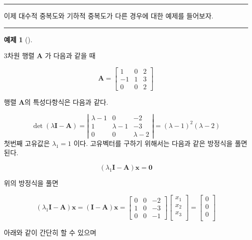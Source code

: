 \documentclass[
  11pt,
  a4paper,
  oneside]{scrbook}
\theoremstyle{definition}
\theoremstyle{definition}
\newtheorem{exercise}{예제}[chapter]
\theoremstyle{plain}
\theoremstyle{remark}
\begin{document}
\begin{center}\rule{0.5\linewidth}{0.5pt}\end{center}

이제 대수적 중복도와 기하적 중복도가 다른 경우에 대한 예제를 들어보자.

\begin{center}\rule{0.5\linewidth}{0.5pt}\end{center}

\begin{exercise}[]\protect\hypertarget{exr-Example-20-2}{}\label{exr-Example-20-2}

3차원 행렬 \(\pmb A\) 가 다음과 같을 때

\[\pmb A=\left[\begin{array}{ccc}1 & 0 & 2 \\ -1 & 1 & 3 \\ 0 & 0 & 2\end{array}\right]\]

행렬 \(\pmb A\)의 특성다항식은 다음과 같다.

\[
\operatorname{det}(\lambda \pmb I -\pmb A)= 
\left|\begin{array}{ccc}
\lambda-1 & 0 & -2 \\
1 & \lambda-1 & -3  \\
0 & 0 & \lambda-2
\end{array}\right|=(\lambda-1)^2(\lambda-2)
\] 첫번째 고유값은 \(\lambda_1=1\) 이다. 고유벡터를 구하기 위해서는
다음과 같은 방정식을 풀면 된다.

\[ (\lambda_1 \pmb I -\pmb A )\pmb x = \pmb 0  \]

위의 방정식을 풀면

\[
(\lambda_1 \pmb I -\pmb A )\pmb x= (\pmb I -\pmb A )\pmb x =
\begin{bmatrix}
0 & 0 & -2 \\
1 & 0 & -3 \\
0 & 0 & -1
\end{bmatrix}
\begin{bmatrix}
x_1 \\
x_2 \\
x_3 \\
\end{bmatrix}
=
\begin{bmatrix}
0 \\
0 \\
0 \\
\end{bmatrix}
\]

아래와 같이 간단히 할 수 있으며


\end{exercise}
\end{document}
